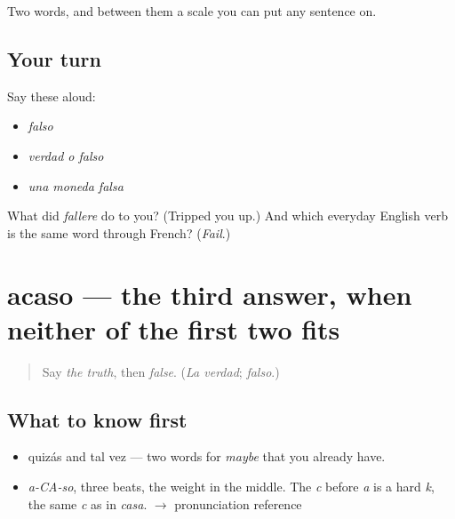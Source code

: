 \begin{grammarlens}[title={What you've built}]
Two words, and between them a scale you can put any sentence on.
\end{grammarlens}

\subsection*{Your turn}
Say these aloud:

\begin{itemize}
\raggedright
  \item \emph{falso}
  \item \emph{verdad o falso}
  \item \emph{una moneda falsa}
\end{itemize}

\begin{tcolorbox}[breakable,colback=teal!4,colframe=teal!35!black,title={Before you move on}]
What did \emph{fallere} do to you? (Tripped you up.) And which everyday English verb is the same word through French? (\emph{Fail}.)
\end{tcolorbox}
\section[acaso]{acaso — the third answer, when neither of the first two fits}

\label{lesson:ES-C324-acaso}



\begin{quote}
Say \emph{the truth}, then \emph{false}. (\emph{La verdad}; \emph{falso}.)
\end{quote}

\subsection*{What to know first}
\begin{itemize}
\raggedright
  \item quizás and tal vez — two words for \emph{maybe} that you already have.
\end{itemize}

\begin{sounds}
\begin{itemize}
\raggedright
  \item \emph{a-CA-so}, three beats, the weight in the middle. The \emph{c} before \emph{a} is a hard \emph{k}, the same \emph{c} as in \emph{casa}. $\to$ pronunciation reference
\end{itemize}
\end{sounds}

